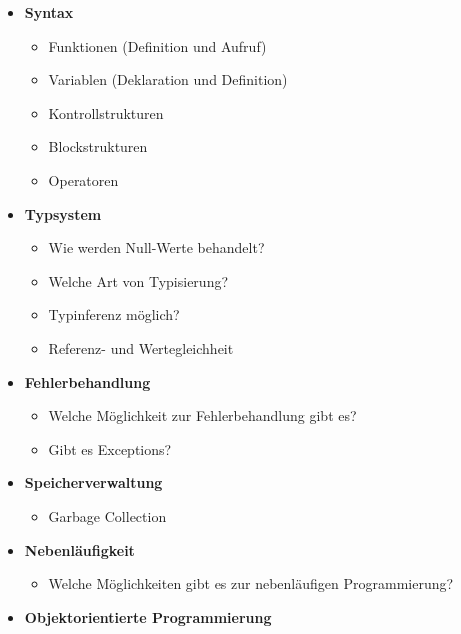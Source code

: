 \documentclass[
    paper=a4,
    bibtotocnumbered,
    liststotocnumbered,
    oneside,
    12pt,
    listof=totoc,
    toc=chapterentrywithdots,
    listof=entryprefix,
]{scrartcl}
\begin{document}
\begin{itemize}%
    \item \textbf{Syntax}
    \begin{itemize}
        \item Funktionen (Definition und Aufruf)
        \item Variablen (Deklaration und Definition)
        \item Kontrollstrukturen
        \item Blockstrukturen
        \item Operatoren
    \end{itemize}
    \item \textbf{Typsystem}
    \begin{itemize}
        \item Wie werden Null-Werte behandelt?
        \item Welche Art von Typisierung?
        \item Typinferenz möglich?
        \item Referenz- und Wertegleichheit
    \end{itemize}
    \item \textbf{Fehlerbehandlung}
    \begin{itemize}
        \item Welche Möglichkeit zur Fehlerbehandlung gibt es?
        \item Gibt es Exceptions?
    \end{itemize}
    \item \textbf{Speicherverwaltung}
    \begin{itemize}
        \item Garbage Collection
    \end{itemize}
    \item \textbf{Nebenläufigkeit}
    \begin{itemize}
      \item Welche Möglichkeiten gibt es zur nebenläufigen Programmierung?  
    \end{itemize}
    \item \textbf{Objektorientierte Programmierung}
    \begin{itemize}

\end{itemize}
\end{itemize}
\end{document}
